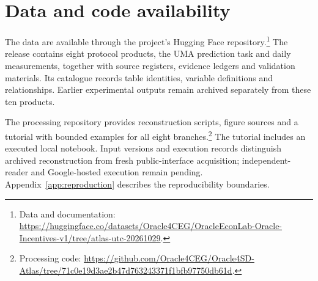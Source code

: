 \section{Data and code availability}

The data are available through the project's Hugging Face repository.\footnote{Data and documentation: \url{https://huggingface.co/datasets/Oracle4CEG/OracleEconLab-Oracle-Incentives-v1/tree/atlas-utc-20261029}.} The release contains eight protocol products, the UMA prediction task and daily measurements, together with source registers, evidence ledgers and validation materials. Its catalogue records table identities, variable definitions and relationships. Earlier experimental outputs remain archived separately from these ten products.

The processing repository provides reconstruction scripts, figure sources and a tutorial with bounded examples for all eight branches.\footnote{Processing code: \url{https://github.com/Oracle4CEG/Oracle4SD-Atlas/tree/71c0e19d3ae2b47d763243371f1bfb97750db61d}.} The tutorial includes an executed local notebook. Input versions and execution records distinguish archived reconstruction from fresh public-interface acquisition; independent-reader and Google-hosted execution remain pending. Appendix~\ref{app:reproduction} describes the reproducibility boundaries.
